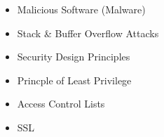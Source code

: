 \documentclass[12pt]{article}
\begin{document}
\begin{itemize}
    \item Malicious Software (Malware)
    \item Stack \& Buffer Overflow Attacks
    \item Security Design Principles
    \item Princple of Least Privilege
    \item Access Control Lists
    \item SSL
\end{itemize}
\end{document}
